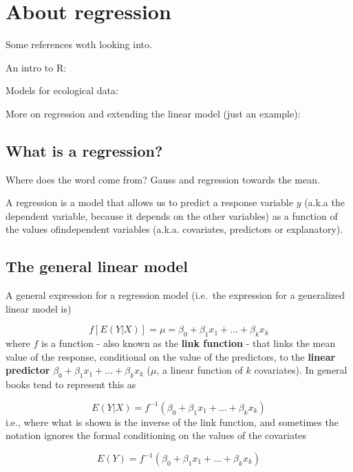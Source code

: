 \documentclass[
]{book}
\begin{document}
\hypertarget{about-regression}{%
\chapter{About regression}\label{about-regression}}

Some references woth looking into.

An intro to R: \citep{Zuur2009a}

Models for ecological data: \citep{Zuur2007}

More on regression and extending the linear model (just an example): \citep{Faraway2006}\citep{Zuur2009b}

\hypertarget{what-is-a-regression}{%
\section{What is a regression?}\label{what-is-a-regression}}

Where does the word come from? Gauss and regression towards the mean.

A regression is a model that allows us to predict a response variable \(y\) (a.k.a the dependent variable, because it depends on the other variables) as a function of the values ofindependent variables (a.k.a. covariates, predictors or explanatory).

\hypertarget{the-general-linear-model}{%
\section{The general linear model}\label{the-general-linear-model}}

A general expression for a regression model (i.e.~the expression for a generalized linear model is)

\[ f[E(Y|X)] = \mu = \beta_0+\beta_1 x_1 + ... + \beta_k x_k \]
where \(f\) is a function - also known as the \textbf{link function} - that links the mean value of the response, conditional on the value of the predictors, to the \textbf{linear predictor} \(\beta_0+\beta_1 x_1 + ... + \beta_k x_k\) (\(\mu\), a linear function of \(k\) covariates). In general books tend to represent this as

\[ E(Y|X) =  f^{-1}(\beta_0+\beta_1 x_1 + ... + \beta_k x_k) \]
i.e., where what is shown is the inverse of the link function,
and sometimes the notation ignores the formal conditioning on the values of the covariates

\[ E(Y) =  f^{-1}(\beta_0+\beta_1 x_1 + ... + \beta_k x_k) \]
\end{document}
